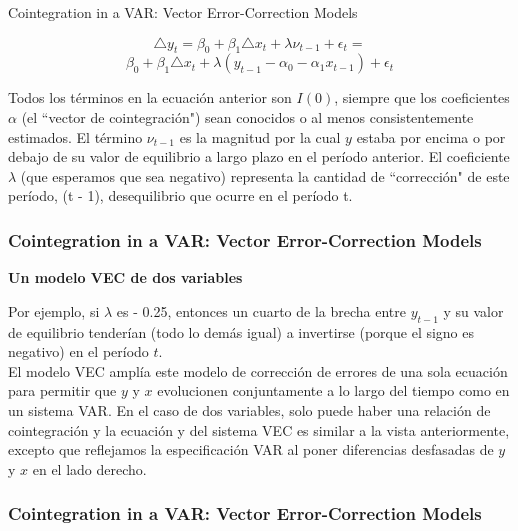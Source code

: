 \documentclass[spanish,xcolor=table]{beamer}
\begin{document}
\begin{section}{Cointegration in a VAR: Vector Error-Correction Models}
\begin{frame}
\begin{equation}
\triangle y_t = \beta_0 + \beta_1 \triangle x_t + \lambda \nu_{t-1} + \epsilon_t = 
\end{equation}
\begin{equation*}
\beta_0 + \beta_1 \triangle x_t + \lambda (y_{t-1} - \alpha_0 - \alpha_1 x_{t-1} ) + \epsilon_t
\end{equation*}

Todos los t\'erminos en la ecuaci\'on anterior son $I(0)$, siempre que los coeficientes $\alpha$ (el ``vector de cointegraci\'on") sean conocidos o al menos consistentemente estimados. El t\'ermino $\nu_{t -1}$ es la magnitud por la cual $y$ estaba por encima o por debajo de su valor de equilibrio a largo plazo en el per\'{i}odo anterior. El coeficiente $\lambda$ (que esperamos que sea negativo) representa la cantidad de ``correcci\'on" de este per\'{i}odo, (t - 1), desequilibrio que ocurre en el per\'{i}odo t. 

\end{frame}

\begin{frame}
\frametitle{Cointegration in a VAR: Vector Error-Correction Models}

\textbf{Un modelo VEC de dos variables}

Por ejemplo, si $\lambda$ es - 0.25, entonces un cuarto de la brecha entre $y_{t - 1}$ y su valor de equilibrio tender\'{i}an (todo lo dem\'as igual) a invertirse (porque el signo es negativo) en el período $t$.\\
\vspace{4mm}	
El modelo VEC ampl\'{i}a este modelo de correcci\'on de errores de una sola ecuaci\'on para permitir que $y$ y $x$ evolucionen conjuntamente a lo largo del tiempo como en un sistema VAR. En el caso de dos variables, solo puede haber una relaci\'on de cointegraci\'on y la ecuaci\'on y del sistema VEC es similar a la vista anteriormente, excepto que reflejamos la especificación VAR al poner diferencias desfasadas de $y$ y $x$ en el lado derecho. 

\end{frame}

\begin{frame}
\frametitle{Cointegration in a VAR: Vector Error-Correction Models}


\end{frame}
\end{section}
\end{document}
